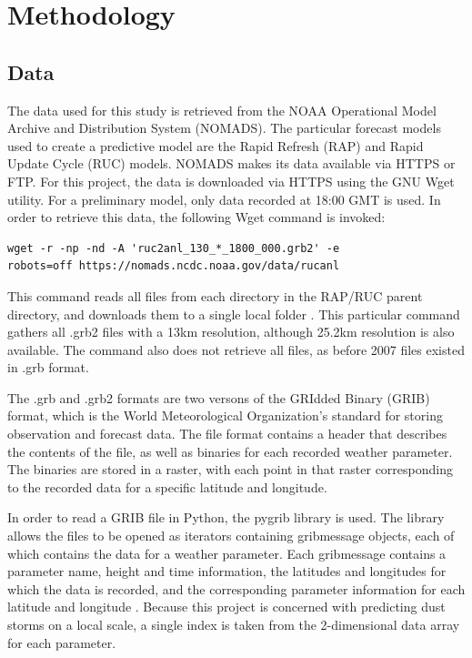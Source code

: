 \documentclass{article}
\begin{document}
\section{Methodology}
\subsection{Data}
The data used for this study is retrieved from the NOAA Operational Model Archive and Distribution System (NOMADS). The particular forecast models used to create a predictive model are the Rapid Refresh (RAP) and Rapid Update Cycle (RUC) models. NOMADS makes its data available via HTTPS or FTP. For this project, the data is downloaded via HTTPS using the GNU Wget utility. For a preliminary model, only data recorded at 18:00 GMT is used. In order to retrieve this data, the following Wget command is invoked:
\begin{verbatim}
wget -r -np -nd -A 'ruc2anl_130_*_1800_000.grb2' -e 
robots=off https://nomads.ncdc.noaa.gov/data/rucanl
\end{verbatim}

This command reads all files from each directory in the RAP/RUC parent directory, and downloads them to a single local folder \cite{wget}. This particular command gathers all .grb2 files with a 13km resolution, although 25.2km resolution is also available. The command also does not retrieve all files, as before 2007 files existed in .grb format.

The .grb and .grb2 formats are two versons of the GRIdded Binary (GRIB) format, which is the World Meteorological Organization's standard for storing observation and forecast data. The file format contains a header that describes the contents of the file, as well as binaries for each recorded weather parameter. The binaries are stored in a raster, with each point in that raster corresponding to the recorded data for a specific latitude and longitude.

In order to read a GRIB file in Python, the pygrib library is used. The library allows the files to be opened as iterators containing gribmessage objects, each of which contains the data for a weather parameter. Each gribmessage contains a parameter name, height and time information, the latitudes and longitudes for which the data is recorded, and the corresponding parameter information for each latitude and longitude \cite{pgdoc}. Because this project is concerned with predicting dust storms on a local scale, a single index is taken from the 2-dimensional data array for each parameter.
\end{document}
